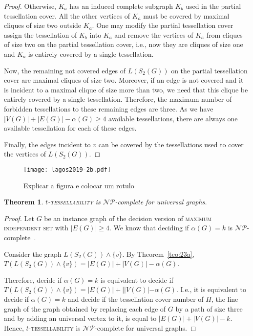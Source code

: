 \documentclass[9pt]{entcs} \usepackage{entcsmacro}
\newtheorem{teo}{Theorem}[section]
\begin{document}
\begin{proof}
Otherwise, $K_a$ has an induced complete subgraph $K_b$ used in the partial tessellation cover.
All the other vertices of $K_a$ must be covered by maximal cliques of size two outside $K_a$. One may modify the partial tessellation cover assign the tessellation of $K_b$ into $K_a$ and remove the vertices of $K_a$ from cliques of size two on the partial tessellation cover, i.e., now they are cliques of size one and $K_a$ is entirely covered by a single tessellation.

Now, the remaining not covered edges of $L(S_2(G))$ on the partial tessellation cover are maximal cliques of size two.
Moreover, if an edge is not covered and it is incident to a maximal clique of size more than two, we need that this clique be entirely covered by a single tessellation.
Therefore, the maximum number of forbidden tessellations to these remaining edges are three.
As we have $|V(G)| + |E(G)| - \alpha(G) \geq 4$ available tessellations, there are always one available tessellation for each of these edges.

Finally, the edges incident to $v$ can be covered by the tessellations used to cover the vertices of $L(S_2(G))$. 
\end{proof}


\begin{figure}
\centering
     \texttt{[image: lagos2019-2b.pdf]}
     \caption{ Explicar a figura e colocar um rotulo \label{fig:universal3}}
\end{figure}

\begin{teo}
\textsc{$t$-tessellability} is $\mathcal{NP}$-complete for universal graphs. 
\label{teo:23b}
\end{teo}
\begin{proof}
Let $G$ be an instance graph of the decision version of \textsc{maximum independent set} with $|E(G)| \geq 4$. 
We know that deciding if $\alpha(G) = k$ is $\mathcal{NP}$-complete~\cite{ArGarey}.

Consider the graph $L(S_2(G)) \land \{v\}$.
By Theorem~\ref{teo:23a},  $T(L(S_2(G)) \land \{v\}) = |E(G)| + |V(G)| - \alpha(G)$.

Therefore, decide if $\alpha(G) = k$ is equivalent to decide if $T(L(S_2(G)) \land \{v\}) = |E(G)| + ||V(G)| - \alpha(G)$.
I.e., it is equivalent to decide if $\alpha(G) = k$ and decide if the tessellation cover number of $H$, the line graph of the graph obtained by replacing each edge of $G$ by a path of size three and by adding an universal vertex to it, is equal to $|E(G)| + |V(G)| - k$.
Hence, \textsc{$t$-tessellability} is $\mathcal{NP}$-complete for universal graphs.
\end{proof}
\end{document}
